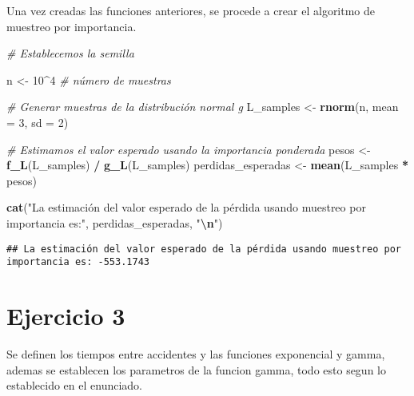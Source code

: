 \documentclass[
]{article}
\newenvironment{Shaded}{\begin{snugshade}}{\end{snugshade}}
\newcommand{\AttributeTok}[1]{\textcolor[rgb]{0.13,0.29,0.53}{#1}}
\newcommand{\CommentTok}[1]{\textcolor[rgb]{0.56,0.35,0.01}{\textit{#1}}}
\newcommand{\DecValTok}[1]{\textcolor[rgb]{0.00,0.00,0.81}{#1}}
\newcommand{\FunctionTok}[1]{\textcolor[rgb]{0.13,0.29,0.53}{\textbf{#1}}}
\newcommand{\NormalTok}[1]{#1}
\newcommand{\OtherTok}[1]{\textcolor[rgb]{0.56,0.35,0.01}{#1}}
\newcommand{\SpecialCharTok}[1]{\textcolor[rgb]{0.81,0.36,0.00}{\textbf{#1}}}
\newcommand{\StringTok}[1]{\textcolor[rgb]{0.31,0.60,0.02}{#1}}
\begin{document}
Una vez creadas las funciones anteriores, se procede a crear el
algoritmo de muestreo por importancia.

\begin{Shaded}
\begin{Highlighting}[]
\CommentTok{\# Establecemos la semilla}

\NormalTok{n }\OtherTok{\textless{}{-}} \DecValTok{10}\SpecialCharTok{\^{}}\DecValTok{4}  \CommentTok{\# número de muestras}

\CommentTok{\# Generar muestras de la distribución normal g}
\NormalTok{L\_samples }\OtherTok{\textless{}{-}} \FunctionTok{rnorm}\NormalTok{(n, }\AttributeTok{mean =} \DecValTok{3}\NormalTok{, }\AttributeTok{sd =} \DecValTok{2}\NormalTok{)}

\CommentTok{\# Estimamos el valor esperado usando la importancia ponderada}
\NormalTok{pesos }\OtherTok{\textless{}{-}} \FunctionTok{f\_L}\NormalTok{(L\_samples) }\SpecialCharTok{/} \FunctionTok{g\_L}\NormalTok{(L\_samples)}
\NormalTok{perdidas\_esperadas }\OtherTok{\textless{}{-}} \FunctionTok{mean}\NormalTok{(L\_samples }\SpecialCharTok{*}\NormalTok{ pesos)}

\FunctionTok{cat}\NormalTok{(}\StringTok{"La estimación del valor esperado de la pérdida usando muestreo por importancia es:"}\NormalTok{, }
\NormalTok{    perdidas\_esperadas, }\StringTok{"}\SpecialCharTok{\textbackslash{}n}\StringTok{"}\NormalTok{)}
\end{Highlighting}
\end{Shaded}

\begin{verbatim}
## La estimación del valor esperado de la pérdida usando muestreo por importancia es: -553.1743
\end{verbatim}

\section{Ejercicio 3}\label{ejercicio-3}

Se definen los tiempos entre accidentes y las funciones exponencial y
gamma, ademas se establecen los parametros de la funcion gamma, todo
esto segun lo establecido en el enunciado.
\end{document}

